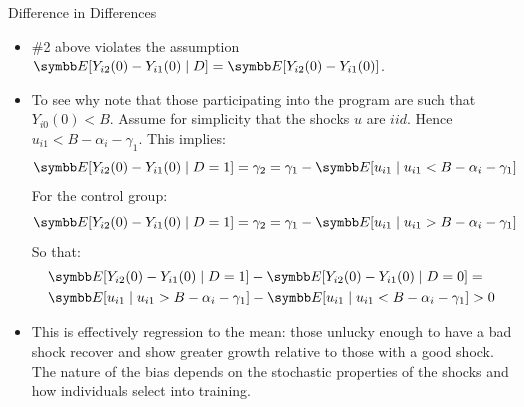 \documentclass[aspectratio=169,11pt]{beamer}
\begin{document}
\begin{frame}{Difference in Differences}
\small
\begin{itemize}
\item  \#2 above violates the assumption {\small $\E[Y_{i2}(0) - Y_{i1}(0) \mid D] = \E[Y_{i2}(0) - Y_{i1}(0)]$}. 
\item To see why note that those participating into the program are such
that {\small $Y_{i0}(0) < B$}. Assume for simplicity that the shocks {\small $u$} are {\small $iid$}. Hence {\small $u_{i1} < B- \alpha_i - \gamma_1$}. 
This implies: 
{\small $$\E[Y_{i2}(0)- Y_{i1}(0) \mid D=1] = \gamma_2 = \gamma_1 - \E[u_{i1} \mid u_{i1} <  B-\alpha_i - \gamma_1]$$}
For the control group:
{\small $$\E[Y_{i2}(0) - Y_{i1}(0) \mid D=1] = \gamma_2 = \gamma_1 - \E[u_{i1} \mid u_{i1} >  B-\alpha_i - \gamma_1]$$}
So that:
\begin{align*}
& \E[Y_{i2}(0) - Y_{i1}(0) \mid D=1] - \E[Y_{i2}(0) - Y_{i1}(0) \mid D=0] =\\
&  \E[u_{i1} \mid u_{i1} >  B-\alpha_i - \gamma_1] - \E[u_{i1} \mid u_{i1} < B-\alpha_i - \gamma_1]  >0
  \end{align*}
 \item This is effectively regression to the mean: those unlucky enough to have a bad shock recover and show greater growth relative to those with a good shock. The nature of the bias depends on the stochastic properties of the shocks and how individuals select into training.
\end{itemize}
\end{frame} 


\end{document}
